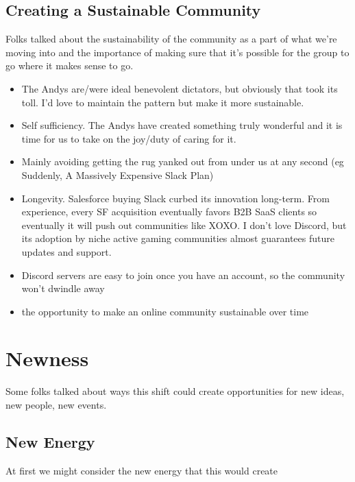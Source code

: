 \documentclass[
]{book}
\providecommand{\tightlist}{%
  \setlength{\itemsep}{0pt}\setlength{\parskip}{0pt}}
\begin{document}
\subsection{Creating a Sustainable Community}\label{creating-a-sustainable-community}

Folks talked about the sustainability of the community as a part of what we're moving into and the importance of making sure that it's possible for the group to go where it makes sense to go.

\begin{itemize}
\tightlist
\item
  The Andys are/were ideal benevolent dictators, but obviously that took its toll. I'd love to maintain the pattern but make it more sustainable.
\item
  Self sufficiency. The Andys have created something truly wonderful and it is time for us to take on the joy/duty of caring for it.
\item
  Mainly avoiding getting the rug yanked out from under us at any second (eg Suddenly, A Massively Expensive Slack Plan)
\item
  Longevity. Salesforce buying Slack curbed its innovation long-term. From experience, every SF acquisition eventually favors B2B SaaS clients so eventually it will push out communities like XOXO. I don't love Discord, but its adoption by niche active gaming communities almost guarantees future updates and support.
\item
  Discord servers are easy to join once you have an account, so the community won't dwindle away
\item
  the opportunity to make an online community sustainable over time
\end{itemize}

\section{Newness}\label{newness}

Some folks talked about ways this shift could create opportunities for new ideas, new people, new events.

\subsection{New Energy}\label{new-energy}

At first we might consider the new energy that this would create
\end{document}
